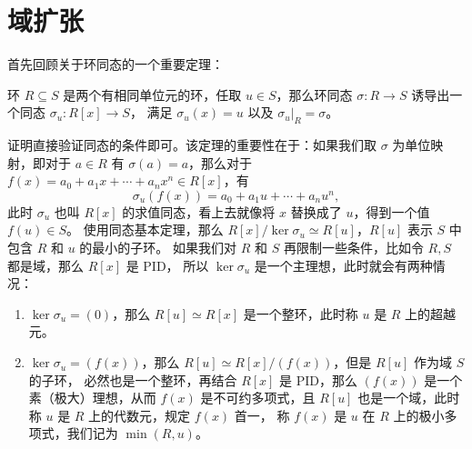 
\section{域扩张}

首先回顾关于环同态的一个重要定理：
\begin{theorem}
  环 $R\subseteq S$ 是两个有相同单位元的环，任取 $u\in S$，那么环同态
   $\sigma:R\to S$ 诱导出一个同态 $\sigma_u:R[x]\to S$，
  满足 $\sigma_u(x)=u$ 以及 $\sigma_u|_R=\sigma$。
\end{theorem}
证明直接验证同态的条件即可。该定理的重要性在于：如果我们取 $\sigma$ 为单位映射，即对于 $a\in R$
有 $\sigma(a)=a$，那么对于 $f(x)=a_0+a_1x+\cdots+a_nx^n\in R[x]$，有
\[
  \sigma_u(f(x))=a_0+a_1u+\cdots+a_nu^n,  
\]
此时 $\sigma_u$ 也叫 $R[x]$ 的求值同态，看上去就像将 $x$ 替换成了 $u$，得到一个值 $f(u)\in S$。
使用同态基本定理，那么 $R[x]/\ker \sigma_u\simeq R[u]$，$R[u]$ 表示 $S$ 中包含 $R$ 和 $u$ 的最小的子环。
如果我们对 $R$ 和 $S$ 再限制一些条件，比如令 $R,S$ 都是域，那么 $R[x]$ 是 PID，
所以 $\ker\sigma_u$ 是一个主理想，此时就会有两种情况：
\begin{enumerate}
  \item $\ker\sigma_u=(0)$，那么 $R[u]\simeq R[x]$ 是一个整环，此时称 $u$ 是 $R$ 上的超越元。
  \item $\ker\sigma_u=(f(x))$，那么 $R[u]\simeq R[x]/(f(x))$，但是 $R[u]$ 作为域 $S$ 的子环，
  必然也是一个整环，再结合 $R[x]$ 是 PID，那么 $(f(x))$ 是一个素（极大）理想，从而
  $f(x)$ 是不可约多项式，且 $R[u]$ 也是一个域，此时称 $u$ 是 $R$ 上的代数元，规定 $f(x)$ 首一，
  称 $f(x)$ 是 $u$ 在 $R$ 上的极小多项式，我们记为 $\min(R,u)$。
\end{enumerate}

